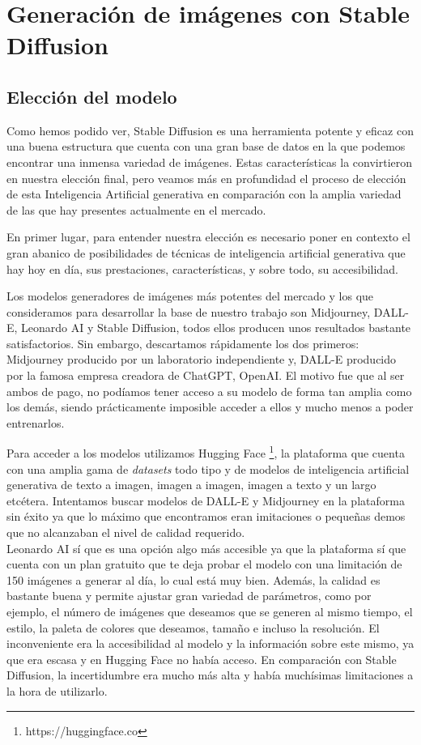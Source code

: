 \chapter{Generación de imágenes con Stable Diffusion}
\label{cap:genimgsia}

\section{Elección del modelo}

Como hemos podido ver, Stable Diffusion es una herramienta potente y eficaz con una buena estructura que cuenta con una gran base de datos en la que podemos encontrar una inmensa variedad de imágenes. Estas características la convirtieron en nuestra elección final, pero veamos más en profundidad el proceso de elección de esta Inteligencia Artificial generativa en comparación con la amplia variedad de las que hay presentes actualmente en el mercado. 

En primer lugar, para entender nuestra elección es necesario poner en contexto el gran abanico de posibilidades de técnicas de inteligencia artificial generativa que hay hoy en día, sus prestaciones, características, y sobre todo, su accesibilidad. 

Los modelos generadores de imágenes más potentes del mercado y los que consideramos para desarrollar la base de nuestro trabajo son Midjourney, DALL-E, Leonardo AI y Stable Diffusion, todos ellos producen unos resultados bastante satisfactorios. Sin embargo, descartamos rápidamente los dos primeros: Midjourney producido por un laboratorio independiente y,
DALL-E producido por la famosa empresa creadora de ChatGPT, OpenAI. El motivo fue que al ser ambos de pago, no podíamos tener acceso a su modelo de forma tan amplia como los demás, siendo prácticamente imposible acceder a ellos y mucho menos a poder entrenarlos. 

Para acceder a los modelos utilizamos Hugging Face \footnote{https://huggingface.co}, la plataforma  que cuenta con una amplia gama de \textit{datasets} todo tipo y de modelos de inteligencia artificial generativa de texto a imagen, imagen a imagen, imagen a texto y un largo etcétera. Intentamos buscar modelos de DALL-E y Midjourney en la plataforma sin éxito ya que lo máximo que encontramos eran imitaciones o pequeñas demos que no alcanzaban el nivel de calidad requerido. \\


Leonardo AI sí que es una opción algo más accesible ya que la plataforma sí que cuenta con un plan gratuito que te deja probar el modelo con una limitación de 150 imágenes a generar al día, lo cual está muy bien. Además, la calidad es bastante buena y permite ajustar gran variedad de parámetros, como por ejemplo, el número de imágenes que deseamos que se generen al mismo tiempo, el estilo, la paleta de colores que deseamos, tamaño e incluso la resolución. El inconveniente era la accesibilidad al modelo y la información sobre este mismo, ya que era escasa y en Hugging Face no había acceso. En comparación con Stable Diffusion, la incertidumbre era mucho más alta y había muchísimas limitaciones a la hora de utilizarlo. \\

